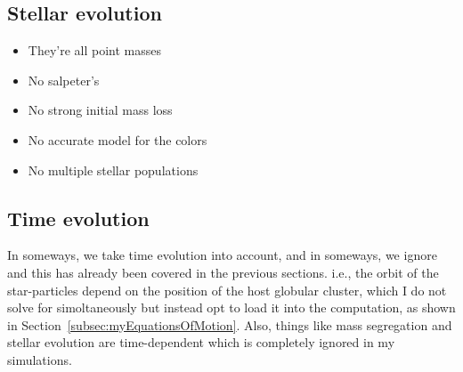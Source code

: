     \subsection{Stellar evolution}
        \begin{itemize}
            \item They're all point masses 
            \item No salpeter's 
            \item No strong initial mass loss 
            \item No accurate model for the colors 
            \item No multiple stellar populations 
        \end{itemize}
    
    \subsection{Time evolution}
        In someways, we take time evolution into account, and in someways, we ignore and this has already been covered in the previous sections. i.e., the orbit of the star-particles depend on the position of the host globular cluster, which I do not solve for simoltaneously but instead opt to load it into the computation, as shown in Section~\ref{subsec:myEquationsOfMotion}. Also, things like mass segregation and stellar evolution are time-dependent which is completely ignored in my simulations. 

